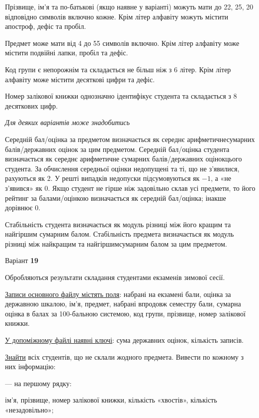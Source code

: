 \documentclass[11pt, ukrainian]{article}
\begin{document}
Прізвище, ім’я та по-батькові (якщо наявне у варіанті) можуть мати до 22, 25, 20 відповідно символів включно кожне. 
Крім літер алфавіту можуть містити апостроф, дефіс та пробіл.

Предмет може мати від 4 до 55 символів включно. 
Крім літер алфавіту може містити подвійні лапки, пробіл та дефіс.

Код групи є непорожнім та складається не більш ніж з 6 літер. 
Крім літер алфавіту може містити десяткові цифри та дефіс.


Номер залікової книжки однозначно ідентифікує студента та складається з 8 десяткових цифр. 

\bigskip\textit{Для деяких варіантів може знадобитись}

Середній бал/оцінка за предметом визначається як середнє арифметичнесумарних балів/державних оцінок за цим предметом. 
Середній бал/оцінка студента визначається як середнє арифметичне сумарних балів/державних оцінокцього студента. 
За обчислення середньої оцінки недопущені та ті, що не з’явилися, рахуються як 2.
У решті випадків недопуски підсумовуються як $-1$, а «не з’явився» як 0.
Якщо студент не гірше ніж задовільно склав усі предмети, 
то його рейтинг за балами/оцінкою визначається як середній бал/оцінка; інакше дорівнює 0.

Стабільність студента визначається як модуль різниці між його кращим та найгіршим сумарним балом.
Стабільність предмета визначається як модуль різниці між найкращим та найгіршимсумарним балом за цим предметом.




\par
\newpage
{\center Варіант  \No \textbf { 19 }\par}
\bigskip
Обробляються результати складання студентами екзаменів зимової сесії.

\underline{Записи основного файлу містять поля}: набрані на екзамені бали, оцінка за державною шкалою, ім’я, предмет, набрані впродовж семестру бали, сумарна оцінка в балах за 100-бальною системою, код групи, прізвище, номер залікової книжки.

\underline{У допоміжному файлі наявні ключі}: сума державних оцінок, кількість записів.

\underline{Знайти} всіх студентів, що не склали жодного предмета. Вивести по кожному з них інформацію:\par
{\noindent}--- на першому рядку:\par
ім’я, прізвище, номер залікової книжки, кількість «хвостів», кількість «незадовільно»;
\end{document}
